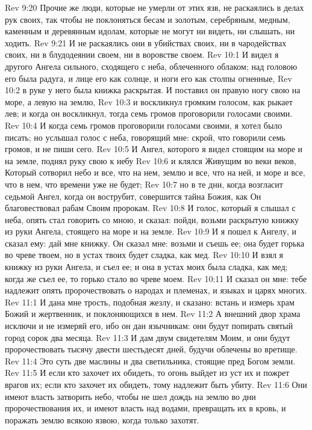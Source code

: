 Rev 9:20  Прочие же люди, которые не умерли от этих язв, не раскаялись в делах рук своих, так чтобы не поклоняться бесам и золотым, серебряным, медным, каменным и деревянным идолам, которые не могут ни видеть, ни слышать, ни ходить.
Rev 9:21  И не раскаялись они в убийствах своих, ни в чародействах своих, ни в блудодеянии своем, ни в воровстве своем.
Rev 10:1  И видел я другого Ангела сильного, сходящего с неба, облеченного облаком; над головою его была радуга, и лице его как солнце, и ноги его как столпы огненные,
Rev 10:2  в руке у него была книжка раскрытая. И поставил он правую ногу свою на море, а левую на землю,
Rev 10:3  и воскликнул громким голосом, как рыкает лев; и когда он воскликнул, тогда семь громов проговорили голосами своими.
Rev 10:4  И когда семь громов проговорили голосами своими, я хотел было писать; но услышал голос с неба, говорящий мне: скрой, что говорили семь громов, и не пиши сего.
Rev 10:5  И Ангел, которого я видел стоящим на море и на земле, поднял руку свою к небу
Rev 10:6  и клялся Живущим во веки веков, Который сотворил небо и все, что на нем, землю и все, что на ней, и море и все, что в нем, что времени уже не будет;
Rev 10:7  но в те дни, когда возгласит седьмой Ангел, когда он вострубит, совершится тайна Божия, как Он благовествовал рабам Своим пророкам.
Rev 10:8  И голос, который я слышал с неба, опять стал говорить со мною, и сказал: пойди, возьми раскрытую книжку из руки Ангела, стоящего на море и на земле.
Rev 10:9  И я пошел к Ангелу, и сказал ему: дай мне книжку. Он сказал мне: возьми и съешь ее; она будет горька во чреве твоем, но в устах твоих будет сладка, как мед.
Rev 10:10  И взял я книжку из руки Ангела, и съел ее; и она в устах моих была сладка, как мед; когда же съел ее, то горько стало во чреве моем.
Rev 10:11  И сказал он мне: тебе надлежит опять пророчествовать о народах и племенах, и языках и царях многих.
Rev 11:1  И дана мне трость, подобная жезлу, и сказано: встань и измерь храм Божий и жертвенник, и поклоняющихся в нем.
Rev 11:2  А внешний двор храма исключи и не измеряй его, ибо он дан язычникам: они будут попирать святый город сорок два месяца.
Rev 11:3  И дам двум свидетелям Моим, и они будут пророчествовать тысячу двести шестьдесят дней, будучи облечены во вретище.
Rev 11:4  Это суть две маслины и два светильника, стоящие пред Богом земли.
Rev 11:5  И если кто захочет их обидеть, то огонь выйдет из уст их и пожрет врагов их; если кто захочет их обидеть, тому надлежит быть убиту.
Rev 11:6  Они имеют власть затворить небо, чтобы не шел дождь на землю во дни пророчествования их, и имеют власть над водами, превращать их в кровь, и поражать землю всякою язвою, когда только захотят.
